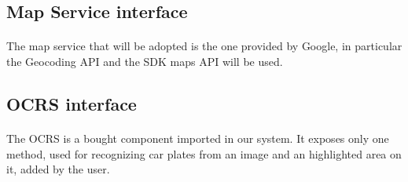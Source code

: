 			\subsection{Map Service interface}
				\paragraph{}
					The map service that will be adopted is the one provided by Google, in particular the Geocoding API and the SDK maps API will be used.
					
			\subsection{OCRS interface}
				\paragraph{}
					The OCRS is a bought component imported in our system. It exposes only one method, used for recognizing car plates from an image and an highlighted area on it, added by the user.
					
